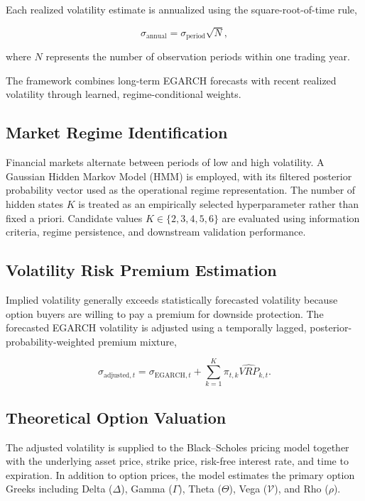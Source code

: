 \documentclass[journal]{IEEEtran}
\begin{document}
Each realized volatility estimate is annualized using the
square-root-of-time rule,

\begin{equation}
\sigma_{\text{annual}} = \sigma_{\text{period}}\sqrt{N},
\end{equation}

where $N$ represents the number of observation periods within one
trading year.

The framework combines long-term EGARCH forecasts with recent realized
volatility through learned, regime-conditional weights.

\subsection{Market Regime Identification}

Financial markets alternate between periods of low and high
volatility. A Gaussian Hidden Markov Model (HMM) is employed, with its
filtered posterior probability vector used as the operational regime
representation. The number of hidden states $K$ is treated as an
empirically selected hyperparameter rather than fixed a priori.
Candidate values $K\in\{2,3,4,5,6\}$ are evaluated using information
criteria, regime persistence, and downstream validation performance.

\subsection{Volatility Risk Premium Estimation}

Implied volatility generally exceeds statistically forecasted
volatility because option buyers are willing to pay a premium for
downside protection. The forecasted EGARCH volatility is adjusted using
a temporally lagged, posterior-probability-weighted premium mixture,

\begin{equation}
\sigma_{\text{adjusted},t}
= \sigma_{\text{EGARCH},t}
+ \sum_{k=1}^{K}\pi_{t,k}\widehat{VRP}_{k,t}.
\end{equation}

\subsection{Theoretical Option Valuation}

The adjusted volatility is supplied to the Black--Scholes pricing
model together with the underlying asset price, strike price,
risk-free interest rate, and time to expiration. In addition to option
prices, the model estimates the primary option Greeks including Delta
($\Delta$), Gamma ($\Gamma$), Theta ($\Theta$), Vega ($\mathcal{V}$),
and Rho ($\rho$).
\end{document}
